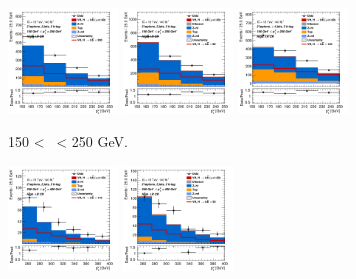 \begin{figure}[h!]
\begin{subfigure}[b]{\textwidth}
        \centering
        \includegraphics[width=0.32\textwidth]{Images/VH/Own_fit/prefit_VHbb/Region_distpTV_BMax250_BMin150_DCRHigh_J2_TTypebb_T2_L2_Y6051_Prefit.png}
        \includegraphics[width=0.32\textwidth]{Images/VH/Own_fit/prefit_VHbb/Region_distpTV_BMax250_BMin150_DCRHigh_J3_TTypebb_T2_L2_Y6051_Prefit.png}
        \includegraphics[width=0.32\textwidth]{Images/VH/Own_fit/prefit_VHbb/Region_distpTV_BMax250_BMin150_DCRHigh_J4_TTypebb_incJet1_T2_L2_Y6051_Prefit.png}
        \caption{150 < \ptv\ < 250 GeV.}
        \label{fig:plots_VHbb_2L_150_CRH}
    \end{subfigure}
    \begin{subfigure}[b]{\textwidth}
        \centering
        \includegraphics[width=0.32\textwidth]{Images/VH/Own_fit/prefit_VHbb/Region_distpTV_BMax400_BMin250_DCRHigh_J2_TTypebb_T2_L2_Y6051_Prefit.png}
        \includegraphics[width=0.32\textwidth]{Images/VH/Own_fit/prefit_VHbb/Region_distpTV_BMax400_BMin250_DCRHigh_J3_TTypebb_T2_L2_Y6051_Prefit.png}

\end{subfigure}
\end{figure}

